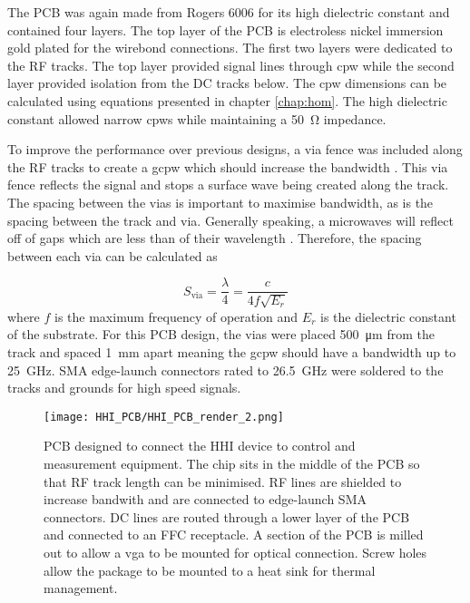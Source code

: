 The PCB was again made from Rogers 6006 for its high dielectric constant and contained four layers. The top layer of the PCB is electroless nickel immersion gold plated for the wirebond connections. The first two layers were dedicated to the RF tracks. The top layer provided signal lines through \ac{cpw} while the second layer provided isolation from the DC tracks below. The \ac{cpw} dimensions can be calculated using equations presented in chapter \ref{chap:hom}. The high dielectric constant allowed narrow \acp{cpw} while maintaining a \SI{50}{\ohm} impedance. 

To improve the performance over previous designs, a via fence was included along the RF tracks to create a \ac{gcpw} which should increase the bandwidth \cite{haydl2002use}. This via fence reflects the signal and stops a surface wave being created along the track. The spacing between the vias is important to maximise bandwidth, as is the spacing between the track and via. Generally speaking, a microwaves will reflect off of gaps which are less than  of their wavelength \cite{Sain2016}. Therefore, the spacing between each via can be calculated as 

\begin{equation}
	S_\text{via} = \frac{\lambda}{4} = \frac{c}{4 f \sqrt{E_r}}
\end{equation}
where $f$ is the maximum frequency of operation and $E_r$ is the dielectric constant of the substrate. For this PCB design, the vias were placed \SI{500}{\um} from the track and spaced \SI{1}{\mm} apart meaning the \ac{gcpw} should have a bandwidth up to \SI{25}{GHz}. SMA edge-launch connectors rated to \SI{26.5}{GHz} were soldered to the tracks and grounds for high speed signals.

\begin{figure}[t]
	\centering
	\texttt{[image: HHI\_PCB/HHI\_PCB\_render\_2.png]}
	\caption[PCB breakout for an InP integrated circuit]{PCB designed to connect the HHI device to control and measurement equipment. The chip sits in the middle of the PCB so that RF track length can be minimised. RF lines are shielded to increase bandwith and are connected to edge-launch SMA connectors. DC lines are routed through a lower layer of the PCB and connected to an FFC receptacle. A section of the PCB is milled out to allow a \ac{vga} to be mounted for optical connection. Screw holes allow the package to be mounted to a heat sink for thermal management.}
	\label{fig:hhi_pcb}
\end{figure}

